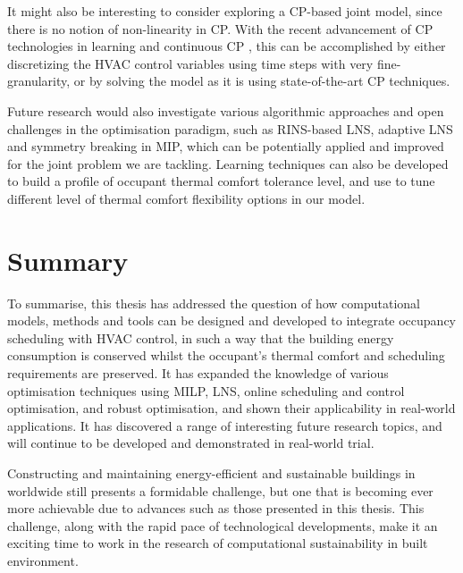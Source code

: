 It might also be interesting to consider exploring a CP-based joint model, since there is no notion of non-linearity in CP. With the recent advancement of CP technologies in learning \citep{chu2011improving,schutt2011improving} and continuous CP \citep{feydy2016interval}, this can be accomplished by either discretizing the HVAC control variables using time steps with very fine-granularity, or by solving the model as it is using state-of-the-art CP techniques. 

Future research would also investigate various algorithmic approaches and open challenges in the optimisation paradigm, such as RINS-based LNS, adaptive LNS and symmetry breaking in MIP, which can be potentially applied and improved for the joint problem we are tackling. Learning techniques can also be developed to build a profile of occupant thermal comfort tolerance level, and use to tune different level of thermal comfort flexibility options in our model.

%

\section{Summary}

To summarise, this thesis has addressed the question of how computational models, methods and tools can be designed and developed to integrate occupancy scheduling with HVAC control, in such a way that the building energy consumption is conserved whilst the occupant's thermal comfort and scheduling requirements are preserved. It has expanded the knowledge of various optimisation techniques using MILP, LNS, online scheduling and control optimisation, and robust optimisation, and shown their applicability in real-world applications. It has discovered a range of interesting future research topics, and will continue to be developed and demonstrated in real-world trial.

Constructing and maintaining energy-efficient and sustainable buildings in worldwide still presents a formidable challenge, but one that is becoming ever more achievable due to advances such as those presented in this thesis. This challenge, along with the rapid pace of technological developments, make it an exciting time to work in the research of computational sustainability in built environment.












